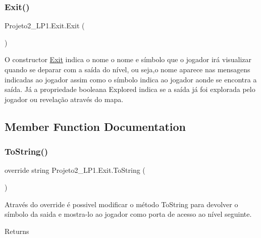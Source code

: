 \subsubsection{\texorpdfstring{Exit()}{Exit()}}
{\footnotesize\ttfamily Projeto2\+\_\+\+L\+P1.\+Exit.\+Exit (\begin{DoxyParamCaption}{ }\end{DoxyParamCaption})\hspace{0.3cm}{\ttfamily [inline]}}



O constructor \mbox{\hyperlink{class_projeto2___l_p1_1_1_exit}{Exit}} indica o nome o nome e símbolo que o jogador irá visualizar quando se deparar com a saída do nível, ou seja,o nome aparece nas mensagens indicadas ao jogador assim como o símbolo indica ao jogador aonde se encontra a saída. Já a propriedade booleana Explored indica se a saída já foi explorada pelo jogador ou revelação através do mapa. 



\subsection{Member Function Documentation}
\mbox{\label{class_projeto2___l_p1_1_1_exit_a45f6b4cb0db046f8b31859370aff2f92}} 
\subsubsection{\texorpdfstring{To\+String()}{ToString()}}
{\footnotesize\ttfamily override string Projeto2\+\_\+\+L\+P1.\+Exit.\+To\+String (\begin{DoxyParamCaption}{ }\end{DoxyParamCaption})\hspace{0.3cm}{\ttfamily [inline]}}



Através do override é possivel modificar o método To\+String para devolver o símbolo da saida e mostra-\/lo ao jogador como porta de acesso ao nível seguinte. 

\begin{DoxyReturn}{Returns}

\end{DoxyReturn}


